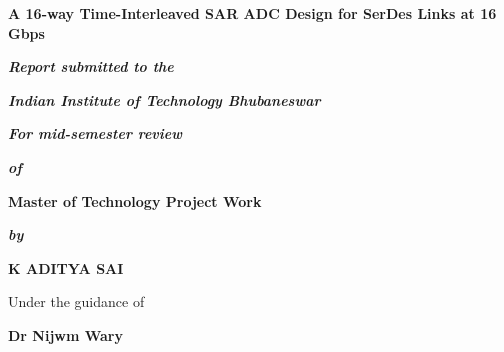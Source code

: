 \begin{titlepage}
\thispagestyle{empty}
\begin{center}
{\Large  \bf A 16-way Time-Interleaved SAR ADC Design for SerDes Links at 16 Gbps}
\end{center}
 \vspace{2em}
\begin{center}
 \textbf{\textit{Report submitted to the}}
\end{center}
 \vspace{-3em}
\begin{center}
 \textbf{\textit{Indian Institute of Technology  Bhubaneswar}} 
\end{center}
 \vspace{-3em}
\begin{center}
 \textbf{\textit{For mid-semester review}} 
\end{center}
 \vspace{-1em}
\begin{center}
 \textbf{\textit{of}}
\end{center}
 \vspace{-1em}
\begin{center}
 \textbf{\large Master of Technology Project Work}
\end{center}
 \vspace{-1em}
\begin{center}
 \textbf{\textit{by}}
\end{center}
 \vspace{-1em}
\begin{center}
 \large{\textbf{K ADITYA SAI}}
\end{center}
 \vspace{-1em}
\begin{center}
 Under the guidance of
\end{center}
 \vspace{-1em}
\begin{center}
 \textbf{Dr Nijwm Wary}
\end{center}
 \vspace{-1em}
\begin{center}

\end{center}
\end{titlepage}
